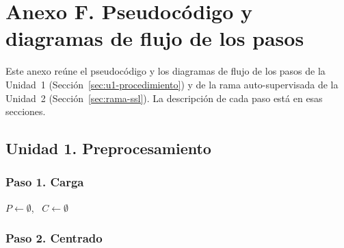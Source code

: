 
\section*{Anexo F. Pseudocódigo y diagramas de flujo de los pasos}
\label{sec:anexo-pasos}

\setcounter{figure}{0}
\setcounter{table}{0}

Este anexo reúne el pseudocódigo y los diagramas de flujo de los pasos de la
Unidad~1 (Sección~\ref{sec:u1-procedimiento}) y de la rama auto-supervisada de la
Unidad~2 (Sección~\ref{sec:rama-ssl}). La descripción de cada paso está en esas
secciones.

\subsection*{Unidad 1. Preprocesamiento}

\subsubsection*{Paso 1. Carga}

\begin{algorithm}[H]
\small
\caption{Paso 1 del Módulo~1, carga.}
$P \leftarrow \emptyset$, \ $C \leftarrow \emptyset$\;
\end{algorithm}

\subsubsection*{Paso 2. Centrado}

